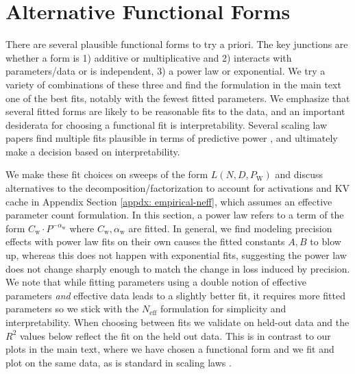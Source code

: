 \documentclass[11pt]{article}
\begin{document}
\section{Alternative Functional Forms}
\label{appdx: forms}

There are several plausible functional forms to try a priori. The key junctions are whether a form is 1) additive or multiplicative and 2) interacts with parameters/data or is independent, 3) a power law or exponential. We try a variety of combinations of these three and find the formulation in the main text one of the best fits, notably with the fewest fitted parameters. We emphasize that several fitted forms are likely to be reasonable fits to the data, and an important desiderata for choosing a functional fit is interpretability. Several scaling law papers find multiple fits plausible in terms of predictive power \citep{muennighoff2024scaling, kaplan2020scaling}, and ultimately make a decision based on interpretability. 

We make these fit choices on sweeps of the form $L(N, D, P_\text{W})$ and discuss alternatives to the decomposition/factorization to account for activations and KV cache in Appendix Section \ref{appdx: empirical-neff}, which assumes an effective parameter count formulation. In this section, a power law refers to a term of the form $C_\text{w} \cdot P^{-\alpha_
\text{w}}$ where $C_\text{w}, \alpha_
\text{w}$ are fitted. In general, we find modeling precision effects with power law fits on their own causes the fitted constants $A, B$ to blow up, whereas this does not happen with exponential fits, suggesting the power law does not change sharply enough to match the change in loss induced by precision. We note that while fitting parameters using a double notion of effective parameters \textit{and} effective data leads to a slightly better fit, it requires more fitted parameters so we stick with the $N_\text{eff}$ formulation for simplicity and interpretability. When choosing between fits we validate on held-out data and the $R^2$ values below reflect the fit on the held out data. This is in contrast to our plots in the main text, where we have chosen a functional form and we  fit and plot on the same data, as is standard in scaling laws \citep{muennighoff2024scaling}. 
\end{document}
